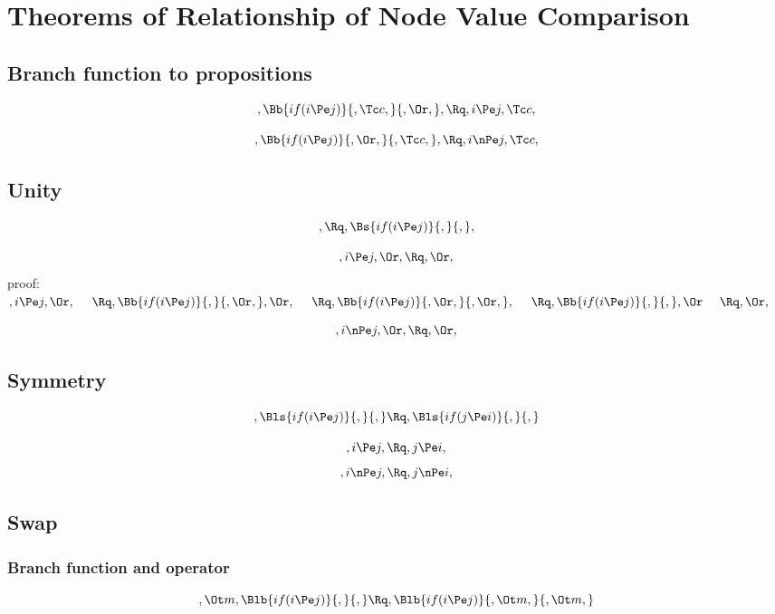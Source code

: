 
 \chapter{Theorems of Relationship of Node Value Comparison}
 \section{Branch function to propositions}
 \[, \Bb{if(i  \Pe j)}{, \Tc c,}{, \Or,},  \Rq ,i  \Pe j,  \Tc c, \]

 \bigskip
 \bigskip
 \[, \Bb{if(i  \Pe j)}{, \Or,}{, \Tc c,},  \Rq ,i  \nPe j,  \Tc c, \]



 \bigskip
 \bigskip
 \bigskip
 \bigskip

 \section{ Unity}
 \[,  \Rq ,  \Bs{if(i  \Pe j)}{,}{,}, \]

 \[, i  \Pe j,  \Or,  \Rq ,  \Or, \]
 \bigskip
 \bigskip
 \bigskip
 \bigskip
proof:  \\
 \begin{math} 
, i  \Pe j,  \Or,   \  \  \  \
 \Rq,   \Bb{if(i  \Pe j)}{,}{, \Or,},  \Or,  \  \  \  \
 \Rq,   \Bb{if(i  \Pe j)}{,  \Or,}{, \Or,},  \  \  \  \
 \Rq,   \Bb{if(i  \Pe j)}{,}{,}, \Or  \  \  \  \
 \Rq,  \Or,
 \end{math}


 \[, i  \nPe j,  \Or,  \Rq ,  \Or, \]



 \bigskip
 \bigskip
 \bigskip
 \bigskip
 \section{ Symmetry}
 \[,  \Bls{if(i  \Pe j)}{,}{,}  \Rq ,  \Bls{if(j  \Pe i)}{,}{,}  \]

 \[, i  \Pe j,  \Rq , j  \Pe i, \]
 \[, i  \nPe j,  \Rq , j  \nPe i, \]


 \bigskip
 \bigskip
 \bigskip
 \bigskip
 \section{ Swap}
 \subsection{Branch function and operator}
 \[, \Ot m,  \Blb{if(i  \Pe j)}{,}{,}  \Rq ,  \Blb{if(i  \Pe j)}{, \Ot m,}{, \Ot m,} \]


